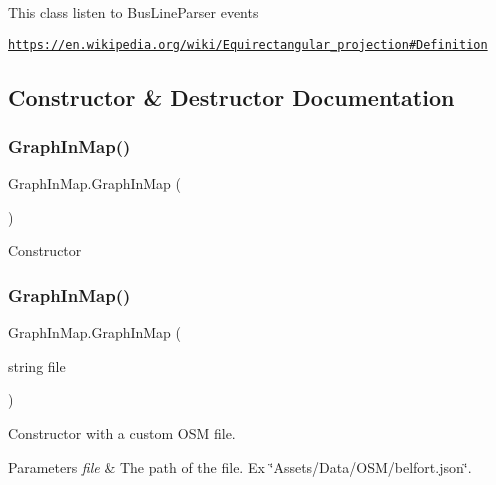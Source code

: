 This class listen to {\ttfamily Bus\+Line\+Parser} events

\href{https://en.wikipedia.org/wiki/Equirectangular_projection#Definition}{\tt https\+://en.\+wikipedia.\+org/wiki/\+Equirectangular\+\_\+projection\#\+Definition}

\subsection{Constructor \& Destructor Documentation}
\mbox{\label{classGraphInMap_ae90bf398b6c8d18784d8d01f28ad1da0}} 
\subsubsection{\texorpdfstring{Graph\+In\+Map()}{GraphInMap()}\hspace{0.1cm}{\footnotesize\ttfamily [1/2]}}
{\footnotesize\ttfamily Graph\+In\+Map.\+Graph\+In\+Map (\begin{DoxyParamCaption}{ }\end{DoxyParamCaption})\hspace{0.3cm}{\ttfamily [inline]}}



Constructor 

\mbox{\label{classGraphInMap_ac9b024f6f816f9451702f1b9a829aa0a}} 
\subsubsection{\texorpdfstring{Graph\+In\+Map()}{GraphInMap()}\hspace{0.1cm}{\footnotesize\ttfamily [2/2]}}
{\footnotesize\ttfamily Graph\+In\+Map.\+Graph\+In\+Map (\begin{DoxyParamCaption}\item[{string}]{file }\end{DoxyParamCaption})\hspace{0.3cm}{\ttfamily [inline]}}



Constructor with a custom O\+SM file. 


\begin{DoxyParams}{Parameters}
{\em file} & The path of the file. Ex \char`\"{}\+Assets/\+Data/\+O\+S\+M/belfort.\+json\char`\"{}.\\
\hline
\end{DoxyParams}


